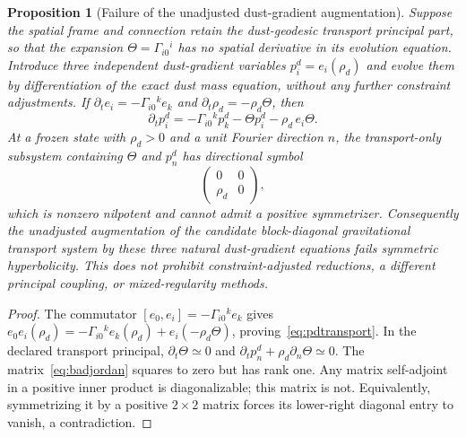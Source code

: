 \documentclass[11pt,a4paper]{article}
\newtheorem{proposition}[theorem]{Proposition}
\begin{document}
\begin{proposition}[Failure of the unadjusted dust-gradient augmentation]\label{prop:dustjordan}
Suppose the spatial frame and connection retain the dust-geodesic transport principal part, so that the expansion $\Theta=\Gamma_{i0}{}^i$ has no spatial derivative in its evolution equation. Introduce three independent dust-gradient variables $p_i^d=e_i(\rho_d)$ and evolve them by differentiation of the exact dust mass equation, \emph{without any further constraint adjustments}. If $\partial_t e_i=-\Gamma_{i0}{}^k e_k$ and $\partial_t\rho_d=-\rho_d\Theta$, then
\begin{equation}\label{eq:pdtransport}
\partial_t p_i^d=-\Gamma_{i0}{}^k p_k^d-\Theta p_i^d-\rho_d\,e_i\Theta.
\end{equation}
At a frozen state with $\rho_d>0$ and a unit Fourier direction $n$, the transport-only subsystem containing $\Theta$ and $p^d_n$ has directional symbol
\begin{equation}\label{eq:badjordan}
\boxed{\begin{pmatrix}0&0\\\rho_d&0\end{pmatrix},}
\end{equation}
which is nonzero nilpotent and cannot admit a positive symmetrizer. Consequently the unadjusted augmentation of the candidate block-diagonal gravitational transport system by these three natural dust-gradient equations fails symmetric hyperbolicity. This does \emph{not} prohibit constraint-adjusted reductions, a different principal coupling, or mixed-regularity methods.
\end{proposition}
\begin{proof}
The commutator $[e_0,e_i]=-\Gamma_{i0}{}^k e_k$ gives
$e_0e_i(\rho_d)=-\Gamma_{i0}{}^k e_k(\rho_d)+e_i(-\rho_d\Theta)$, proving~\eqref{eq:pdtransport}. In the declared transport principal, $\partial_t\Theta\simeq0$ and $\partial_t p_n^d+\rho_d\partial_n\Theta\simeq0$. The matrix~\eqref{eq:badjordan} squares to zero but has rank one. Any matrix self-adjoint in a positive inner product is diagonalizable; this matrix is not. Equivalently, symmetrizing it by a positive $2\times2$ matrix forces its lower-right diagonal entry to vanish, a contradiction.
\end{proof}
\end{document}

